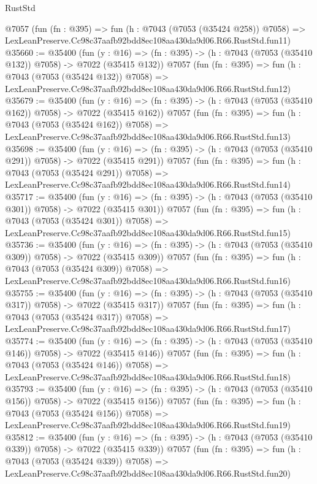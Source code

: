 \begin{lexlean}{RustStd}
\begin{coremodule}
    @7057
    (fun (fn : @395) =>
    fun (h : @7043 (@7053 (@35424 @258)) @7058) =>
    LexLeanPreserve.Cc98c37aafb92bdd8ec108aa430da9d06.R66.RustStd.fun11)
@35660 := @35400
    (fun (y : @16) => (fn : @395) -> (h : @7043 (@7053 (@35410 @132)) @7058) -> @7022 (@35415 @132))
    @7057
    (fun (fn : @395) =>
    fun (h : @7043 (@7053 (@35424 @132)) @7058) =>
    LexLeanPreserve.Cc98c37aafb92bdd8ec108aa430da9d06.R66.RustStd.fun12)
@35679 := @35400
    (fun (y : @16) => (fn : @395) -> (h : @7043 (@7053 (@35410 @162)) @7058) -> @7022 (@35415 @162))
    @7057
    (fun (fn : @395) =>
    fun (h : @7043 (@7053 (@35424 @162)) @7058) =>
    LexLeanPreserve.Cc98c37aafb92bdd8ec108aa430da9d06.R66.RustStd.fun13)
@35698 := @35400
    (fun (y : @16) => (fn : @395) -> (h : @7043 (@7053 (@35410 @291)) @7058) -> @7022 (@35415 @291))
    @7057
    (fun (fn : @395) =>
    fun (h : @7043 (@7053 (@35424 @291)) @7058) =>
    LexLeanPreserve.Cc98c37aafb92bdd8ec108aa430da9d06.R66.RustStd.fun14)
@35717 := @35400
    (fun (y : @16) => (fn : @395) -> (h : @7043 (@7053 (@35410 @301)) @7058) -> @7022 (@35415 @301))
    @7057
    (fun (fn : @395) =>
    fun (h : @7043 (@7053 (@35424 @301)) @7058) =>
    LexLeanPreserve.Cc98c37aafb92bdd8ec108aa430da9d06.R66.RustStd.fun15)
@35736 := @35400
    (fun (y : @16) => (fn : @395) -> (h : @7043 (@7053 (@35410 @309)) @7058) -> @7022 (@35415 @309))
    @7057
    (fun (fn : @395) =>
    fun (h : @7043 (@7053 (@35424 @309)) @7058) =>
    LexLeanPreserve.Cc98c37aafb92bdd8ec108aa430da9d06.R66.RustStd.fun16)
@35755 := @35400
    (fun (y : @16) => (fn : @395) -> (h : @7043 (@7053 (@35410 @317)) @7058) -> @7022 (@35415 @317))
    @7057
    (fun (fn : @395) =>
    fun (h : @7043 (@7053 (@35424 @317)) @7058) =>
    LexLeanPreserve.Cc98c37aafb92bdd8ec108aa430da9d06.R66.RustStd.fun17)
@35774 := @35400
    (fun (y : @16) => (fn : @395) -> (h : @7043 (@7053 (@35410 @146)) @7058) -> @7022 (@35415 @146))
    @7057
    (fun (fn : @395) =>
    fun (h : @7043 (@7053 (@35424 @146)) @7058) =>
    LexLeanPreserve.Cc98c37aafb92bdd8ec108aa430da9d06.R66.RustStd.fun18)
@35793 := @35400
    (fun (y : @16) => (fn : @395) -> (h : @7043 (@7053 (@35410 @156)) @7058) -> @7022 (@35415 @156))
    @7057
    (fun (fn : @395) =>
    fun (h : @7043 (@7053 (@35424 @156)) @7058) =>
    LexLeanPreserve.Cc98c37aafb92bdd8ec108aa430da9d06.R66.RustStd.fun19)
@35812 := @35400
    (fun (y : @16) => (fn : @395) -> (h : @7043 (@7053 (@35410 @339)) @7058) -> @7022 (@35415 @339))
    @7057
    (fun (fn : @395) =>
    fun (h : @7043 (@7053 (@35424 @339)) @7058) =>
    LexLeanPreserve.Cc98c37aafb92bdd8ec108aa430da9d06.R66.RustStd.fun20)

\end{coremodule}
\end{lexlean}
